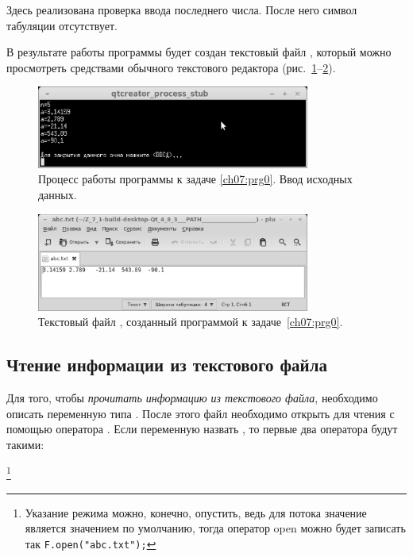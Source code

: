 Здесь реализована проверка ввода последнего числа. После него символ табуляции отсутствует.

В результате работы программы будет создан текстовый файл , который можно просмотреть
средствами обычного текстового редактора (рис.~\ref{ch07:refDrawing0}--\ref{ch07:refDrawing1}).
\begin{figure}[htb]
\begin{center}
\includegraphics[width=0.8\textwidth]{img/ris_7_1}
\caption{Процесс работы программы к задаче \ref{ch07:prg0}. Ввод исходных данных.}
\label{ch07:refDrawing0}
\end{center}
\end{figure}
\begin{figure}[htb]
\begin{center}
\includegraphics[width=0.8\textwidth]{img/ris_7_2}
\caption{Текстовый файл , созданный программой к задаче~\ref{ch07:prg0}.}
\label{ch07:refDrawing1}
\end{center}
\end{figure}

\subsection[Чтение информации из текстового файла]{Чтение информации из текстового файла}\label{ch07:2.2}

Для того, чтобы \emph{прочитать информацию из текстового файла},
необходимо описать переменную типа . После этого файл необходимо открыть для чтения с
помощью оператора . Если переменную назвать , то первые два оператора будут
такими:


\footnote{Указание режима  можно, конечно, опустить,
ведь для потока  значение  является значением по умолчанию, тогда 
оператор open можно будет записать так \lstinline!F.open("abc.txt");!}

